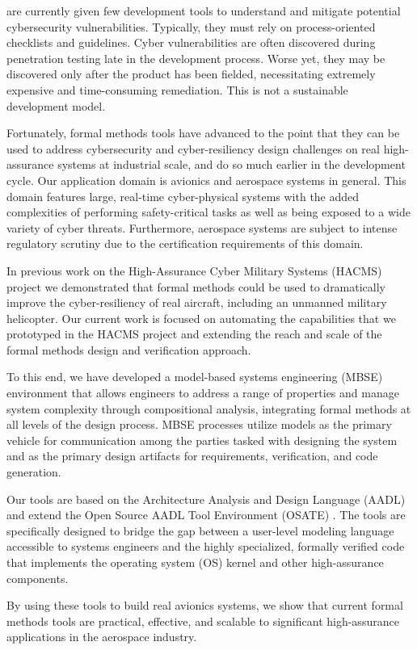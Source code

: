  are currently given few
development tools to understand and mitigate 
potential cybersecurity vulnerabilities.  Typically, they must rely on
process-oriented checklists and guidelines. Cyber vulnerabilities
are often discovered during penetration testing late in the
development process. Worse yet, they may be discovered
only after the product has been fielded, necessitating extremely
expensive and time-consuming remediation. This is not a
sustainable development model.

Fortunately, formal methods tools have advanced to the point that they can 
be used to address cybersecurity and cyber-resiliency design challenges
on real high-assurance systems at industrial scale, and do so much earlier in
the development cycle.  Our application domain is avionics and aerospace systems in general.  
This domain features large, real-time cyber-physical systems with the added 
complexities of performing safety-critical tasks as well as being exposed to 
a wide variety of cyber threats.  Furthermore, aerospace systems are subject 
to intense regulatory scrutiny due to the certification requirements of this domain. 

In previous work on the High-Assurance Cyber Military Systems (HACMS) project \cite{HACMS}
we demonstrated that formal methods could be used to dramatically improve the 
cyber-resiliency of real aircraft, including an unmanned military helicopter.  Our current
work is focused on automating the capabilities that we prototyped in the HACMS project
and extending the reach and scale of the formal methods design and verification approach.  

To this end, we have developed a model-based systems engineering (MBSE) 
environment that allows engineers to address a range of properties and 
manage system complexity through compositional analysis, integrating formal methods
at all levels of the design process.  MBSE processes utilize models as the primary vehicle for 
communication among the parties tasked with designing the system and as the primary 
design artifacts for requirements, verification, and code generation.  

Our tools are based on the 
Architecture Analysis and Design Language (AADL) and extend the Open Source
AADL Tool Environment (OSATE) \cite{OSATE}.  The tools are specifically designed 
to bridge the gap between a user-level modeling language accessible to systems 
engineers and the highly specialized, formally verified code that implements the operating system (OS)
kernel and other high-assurance components.   

By using these tools to build real avionics systems, we show 
that current formal methods tools are practical, effective, and scalable to significant 
high-assurance applications in the aerospace industry.  
